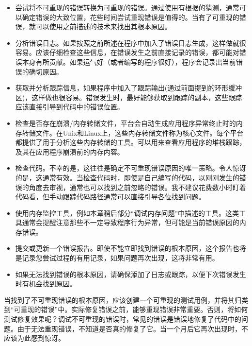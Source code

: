 \begin{itemize}
\item
尝试将不可重现的错误转换为可重现的错误。通过使用有根据的猜测，通常可以确定错误的大致位置，花些时间尝试重现错误是值得的。当有了可重现的错误，就可以使用之前描述的技术来找出其根本原因。

\item
分析错误日志。如果按照之前所述在程序中加入了错误日志生成，这样做就很容易。应该仔细检查这些信息，在错误发生之前直接记录的错误，都可能对错误本身有所贡献。如果运气好（或者编写的程序很好），程序会记录出当前错误的确切原因。

\item
获取并分析跟踪信息，如果程序中加入了跟踪输出(通过前面提到的环形缓冲区)，这样做也很容易。错误发生时，最好能够获取到跟踪的副本，这些跟踪应该直接引导到代码中的错误位置。

\item
检查是否存在崩溃/内存转储文件，平台会自动生成应用程序异常终止时的内存转储文件。在Unix和Linux上，这些内存转储文件称为核心文件。每个平台都提供了用于分析这些内存转储的工具。可以用来查看应用程序的堆栈跟踪，及其在应用程序崩溃前的内存内容。

\item
检查代码。不幸的是，这往往是确定不可重现错误原因的唯一策略。令人惊讶的是，这通常有效。当检查代码时，即使是自己编写的代码，以刚刚发生的错误的角度去审视，通常也可以找到之前忽略的错误。我不建议花费数小时盯着代码看，但手动跟踪代码路径通常可以直接引导各位找到问题。

\item
使用内存监控工具，例如本章稍后部分“调试内存问题”中描述的工具。这类工具通常会提醒注意那些不一定导致程序行为异常，但可能是当前错误原因的内存错误。

\item
提交或更新一个错误报告。即使不能立即找到错误的根本原因，这个报告也将是记录您尝试过程的有用记录，如果问题再次出现，这将非常有用。

\item
如果无法找到错误的根本原因，请确保添加了日志或跟踪，以便下次错误发生时有机会找到原因。
\end{itemize}

当找到了不可重现错误的根本原因，应该创建一个可重现的测试用例，并将其归类到“可重现的错误”中。实际修复错误之前，能够重现错误非常重要。否则，将如何测试修复效果呢？调试不可重现的错误时，常见的错误是错误地修复了代码中的问题。由于无法重现错误，不知道是否真的修复了它。当一个月后它再次出现时，不应该为此感到惊讶。


